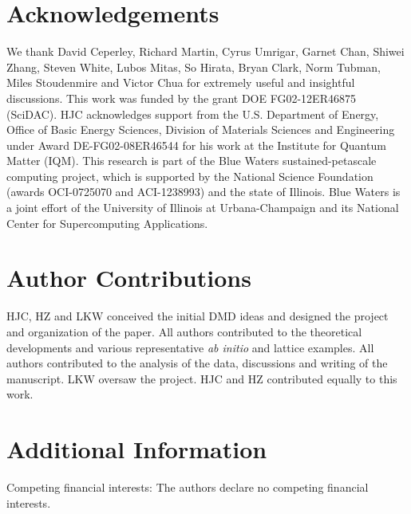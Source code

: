 \section{Acknowledgements} 
We thank  David Ceperley,  Richard Martin, Cyrus Umrigar,  Garnet Chan,  Shiwei Zhang, Steven White,  
Lubos Mitas, So Hirata, Bryan Clark, Norm Tubman, Miles Stoudenmire and Victor Chua for extremely useful and insightful discussions. 
This work was funded by the grant DOE FG02-12ER46875 (SciDAC). HJC acknowledges support from the U.S. Department of Energy, 
Office of Basic Energy Sciences, Division of Materials Sciences and Engineering under Award DE-FG02-08ER46544 for his work at the Institute for Quantum Matter (IQM). 
This research is part of the Blue Waters sustained-petascale computing project, which is supported by the National Science Foundation (awards OCI-0725070 and ACI-1238993) and the state of Illinois. Blue Waters is a joint effort of the University of Illinois at Urbana-Champaign and its National Center for Supercomputing Applications.

\section*{Author Contributions}
HJC, HZ and LKW conceived the initial DMD ideas and designed the project and organization of the paper. 
All authors contributed to the theoretical developments and various representative \textit{ab initio} and lattice examples. 
All authors contributed to the analysis of the data, discussions and writing of the manuscript. 
LKW oversaw the project. HJC and HZ contributed equally to this work.
 
\section*{Additional Information}
Competing financial interests: The authors declare no competing financial interests.
